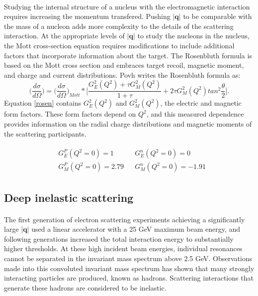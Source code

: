 \paragraph{} Studying the internal structure of a nucleus with the electromagnetic interaction requires increasing the momentum transfered. Pushing $|\boldsymbol{q}|$ to be comparable with the mass of a nucleon adds more complexity to the details of the scattering interaction. At the appropriate levels of $|\boldsymbol{q}|$ to study the nucleons in the nucleus, the Mott cross-section equation requires modifications to include additional factors that incorporate information about the target. The Rosenbluth formula is based on the Mott cross section and embraces target recoil, magnetic moment, and charge and current distributions. Povh writes the Rosenbluth formula as:
\begin{equation}
\label{rosen}
\bigg(\frac{d\sigma}{d\Omega}\bigg)=\bigg(\frac{d\sigma}{d\Omega}\bigg)_{Mott} *\bigg\lbrack \frac{G^2_E(Q^2) +\tau G^2_M(Q^2)}{1+\tau} + 2\tau G^2_M(Q^2)tan^2\frac{\theta}{2} \bigg\rbrack.
\end{equation}
Equation \ref{rosen} contains $G^2_E(Q^2)$ and $G^2_M(Q^2)$, the electric and magnetic form factors. These form factors depend on $Q^2$, and this measured dependence provides information on the radial charge distributions and magnetic moments of the scattering participants. 

\begin{align}
	\begin{split}
		&G^P_E(Q^2=0) = 1 \\
		&G^P_M(Q^2=0) = 2.79
	\end{split}
	\begin{split}
	    &G^n_E(Q^2=0) = 0 \\
	    &G^n_M(Q^2=0) = -1.91 \label{FFeq}
	\end{split}
\end{align}



\subsection{Deep inelastic scattering}\label{sec:DIS}
\paragraph{}The first generation of electron scattering experiments achieving a significantly large  $|\boldsymbol{q}|$ used a linear accelerator with a 25 GeV maximum beam energy, and following generations increased the total interaction energy to substantially higher thresholds. At these high incident beam energies, individual resonances cannot be separated in the invariant mass spectrum above 2.5 GeV. Observations made into this convoluted invariant mass spectrum has shown that many strongly interacting particles are produced, known as hadrons. Scattering interactions that generate these hadrons are considered to be inelastic. 
